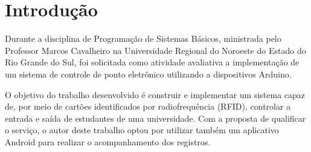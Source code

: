 \chapter{Introdução}
\label{introducao}

Durante a disciplina de Programação de Sistemas Básicos, ministrada pelo Professor Marcos Cavalheiro na Universidade Regional do Noroeste do Estado do Rio Grande do Sul, foi solicitada como atividade avaliativa a implementação de um sistema de controle de ponto eletrônico utilizando a dispositivos Arduino. 

O objetivo do trabalho desenvolvido é construir e implementar um sistema capaz de, por meio de cartões identificados por radiofrequência (RFID), controlar a entrada e saída de estudantes de uma universidade. Com a proposta de qualificar o serviço, o autor deste trabalho optou por utilizar também um aplicativo Android para realizar o acompanhamento dos registros.